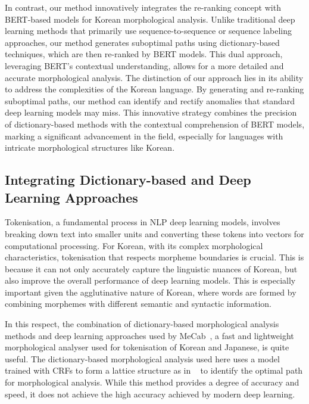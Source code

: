 \documentclass[AMS,STIX2COL]{WileyNJD-v2}
\begin{document}
    In contrast, our method innovatively integrates the re-ranking concept with BERT-based models for Korean morphological analysis.
    Unlike traditional deep learning methods that primarily use sequence-to-sequence or sequence labeling approaches, our method generates suboptimal paths using dictionary-based techniques, which are then re-ranked by BERT models.
    This dual approach, leveraging BERT's contextual understanding, allows for a more detailed and accurate morphological analysis.
    The distinction of our approach lies in its ability to address the complexities of the Korean language.
    By generating and re-ranking suboptimal paths, our method can identify and rectify anomalies that standard deep learning models may miss.
    This innovative strategy combines the precision of dictionary-based methods with the contextual comprehension of BERT models, marking a significant advancement in the field, especially for languages with intricate morphological structures like Korean.

    \subsection{Integrating Dictionary-based and Deep Learning Approaches}\label{subsec:integrating-dictionary-based-and-deep-learning-approaches}
    Tokenisation, a fundamental process in NLP deep learning models, involves breaking down text into smaller units and converting these tokens into vectors for computational processing.
    For Korean, with its complex morphological characteristics, tokenisation that respects morpheme boundaries is crucial.
    This is because it can not only accurately capture the linguistic nuances of Korean, but also improve the overall performance of deep learning models.
    This is especially important given the agglutinative nature of Korean, where words are formed by combining morphemes with different semantic and syntactic information.

    In this respect, the combination of dictionary-based morphological analysis methods and deep learning approaches used by MeCab~\cite{MeCab}, a fast and lightweight morphological analyser used for tokenisation of Korean and Japanese, is quite useful.
    The dictionary-based morphological analysis used here uses a model trained with CRFs to form a lattice structure as in ~\cite{Kudo2004, NaSH2014, NaSH2018} to identify the optimal path for morphological analysis.
    While this method provides a degree of accuracy and speed, it does not achieve the high accuracy achieved by modern deep learning.
\end{document}
